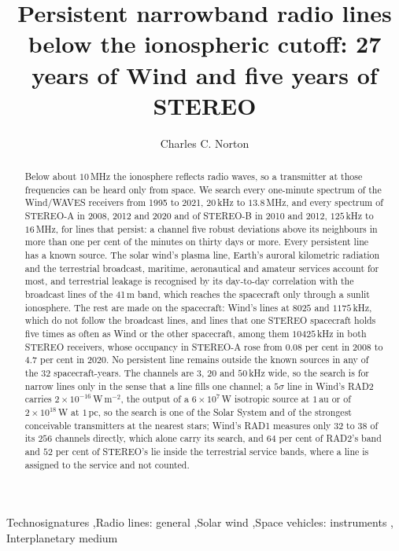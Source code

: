 \documentclass[3p,11pt]{elsarticle}
\begin{document}
\begin{frontmatter}

\title{Persistent narrowband radio lines below the ionospheric cutoff: 27 years of Wind and five years of STEREO}

\author{Charles C. Norton}

\begin{abstract}
Below about $10$\,MHz the ionosphere reflects radio waves, so a transmitter at those
frequencies can be heard only from space. We search every one-minute spectrum of the
Wind/WAVES receivers from 1995 to 2021, $20$\,kHz to $13.8$\,MHz, and every spectrum of
STEREO-A in 2008, 2012 and 2020 and of STEREO-B in 2010 and 2012, $125$\,kHz to
$16$\,MHz, for lines that persist: a channel five robust deviations above its
neighbours in more than one per cent of the minutes on thirty days or more. Every
persistent line has a known source. The solar wind's plasma line, Earth's auroral
kilometric radiation and the terrestrial broadcast, maritime, aeronautical and amateur
services account for most, and terrestrial leakage is recognised by its day-to-day
correlation with the broadcast lines of the 41\,m band, which reaches the spacecraft
only through a sunlit ionosphere. The rest are made on the spacecraft: Wind's lines at
$8025$ and $1175$\,kHz, which do not follow the broadcast lines, and lines that one
STEREO spacecraft holds five times as often as Wind or the other spacecraft, among them
$10425$\,kHz in both STEREO receivers, whose occupancy in STEREO-A rose from $0.08$ per
cent in 2008 to $4.7$ per cent in 2020. No persistent line remains outside the known
sources in any of the $32$ spacecraft-years. The channels are $3$, $20$ and $50$\,kHz
wide, so the search is for narrow lines only in the sense that a line fills one
channel; a $5\sigma$ line in Wind's RAD2 carries $2\times10^{-16}$\,W\,m$^{-2}$, the
output of a $6\times10^{7}$\,W isotropic source at $1$\,au or of $2\times10^{18}$\,W at
$1$\,pc, so the search is one of the Solar System and of the strongest conceivable
transmitters at the nearest stars; Wind's RAD1 measures only $32$ to $38$ of its $256$
channels directly, which alone carry its search, and $64$ per cent of RAD2's band and
$52$ per cent of STEREO's lie inside the terrestrial service bands, where a line is
assigned to the service and not counted.
\end{abstract}

\begin{keyword}
Technosignatures \sep Radio lines: general \sep Solar wind \sep Space vehicles: instruments \sep
Interplanetary medium
\end{keyword}

\end{frontmatter}
\end{document}
